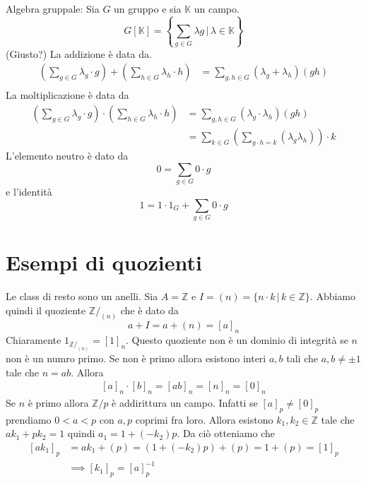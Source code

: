\documentclass[a4paper]{article}
\begin{document}
Algebra gruppale: Sia \(G\) un gruppo e sia \(\mathbb{K}\) un campo.
\[
    G[\mathbb{K}] = \left\{
        \sum_{g\in G} \lambda g \,|\, \lambda \in \mathbb{K}
    \right\}
\]
(Giusto?)
La addizione è data da.
\begin{align*}
    \left( \sum_{g\in G} \lambda_g \cdot g \right)
    + \left( \sum_{h\in G} \lambda_h \cdot h \right)
    &= \sum_{g,h \in G} (\lambda_g + \lambda_h) (gh) \\
\end{align*}
La moltiplicazione è data da
\begin{align*}
    \left( \sum_{g\in G} \lambda_g \cdot g \right)
    \cdot \left( \sum_{h\in G} \lambda_h \cdot h \right)
    &= \sum_{g,h \in G} (\lambda_g \cdot \lambda_h) (gh) \\
    &= \sum_{k\in G} \left(\sum_{g\cdot h = k} (\lambda_g \lambda_h) \right) \cdot k
\end{align*}
L'elemento neutro è dato da
\[
    0 = \sum_{g\in G} 0 \cdot g
\]
e l'identità
\[
    1 = 1 \cdot 1_G + \sum_{g\in G} 0 \cdot g
\]


\section{Esempi di quozienti}

Le class di resto sono un anelli.
Sia \(A = \mathbb{Z}\) e \(I = (n) = \{n \cdot k \,|\, k \in \mathbb{Z}\}\).
Abbiamo quindi il quoziente \(\mathbb{Z}/_{(n)}\) che è dato da
\[
    a+I = a+(n) = {[a]}_n
\]
Chiaramente \(1_{\mathbb{Z}/_{(n)}} = {[1]}_n\).
Questo quoziente non è un dominio di integrità se \(n\) non è un numro primo.
Se non è primo allora esistono interi \(a,b\)
tali che \(a,b \neq \pm 1\)
tale che \(n=ab\). Allora
\begin{align*}
    {[a]}_n \cdot {[b]}_n = {[ab]}_n = {[n]}_n = {[0]}_n
\end{align*}
Se \(n\) è primo allora \(\mathbb{Z}/p\) è addirittura un campo.
Infatti se \({[a]}_p \neq {[0]}_p\)
prendiamo \(0 < a < p\) con \(a,p\) coprimi fra loro.
Allora esistono \(k_1, k_2 \in \mathbb{Z}\)
tale che \(ak_1 + pk_2 = 1\)
quindi \(a_1 = 1 + (-k_2)p\).
Da ciò otteniamo che
\begin{align*}
    {[ak_1]}_p &= ak_1 + (p) = \left(1 + (-k_2)p\right) + (p)
    = 1 + (p) = {[1]}_p \\
    &\implies {[k_1]}_p = {[a]}_p^{-1}
\end{align*}
\end{document}
